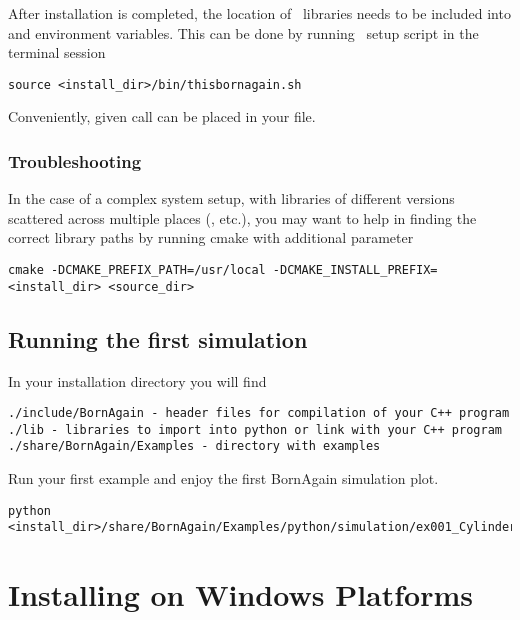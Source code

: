 After installation is completed, the location of \BornAgain\ libraries needs to be included into
 and  environment variables.
This can be done by running \BornAgain\ setup script in the terminal session
\begin{lstlisting}[language=shell, style=commandline]
source <install_dir>/bin/thisbornagain.sh
\end{lstlisting}
Conveniently, given call can be placed in your  file.


\subsubsection{Troubleshooting}

In the case of a complex system setup, with libraries of different versions 
scattered across multiple places (,  etc.),
you may want to help  in finding the correct library paths
by running cmake with additional parameter 
\begin{lstlisting}[language=shell, style=commandline]
cmake -DCMAKE_PREFIX_PATH=/usr/local -DCMAKE_INSTALL_PREFIX=<install_dir> <source_dir>
\end{lstlisting}



\subsection{Running the first simulation}

In your installation directory you will find
\begin{lstlisting}[language=shell, style=commandline, keywordstyle=\color{black}]
./include/BornAgain - header files for compilation of your C++ program
./lib - libraries to import into python or link with your C++ program
./share/BornAgain/Examples - directory with examples
\end{lstlisting}

Run your first example and enjoy the first BornAgain simulation plot.
\begin{lstlisting}[language=shell, style=commandline]
python <install_dir>/share/BornAgain/Examples/python/simulation/ex001_CylindersAndPrisms/CylindersAndPrisms.py
\end{lstlisting}




\section{Installing on Windows Platforms} 


